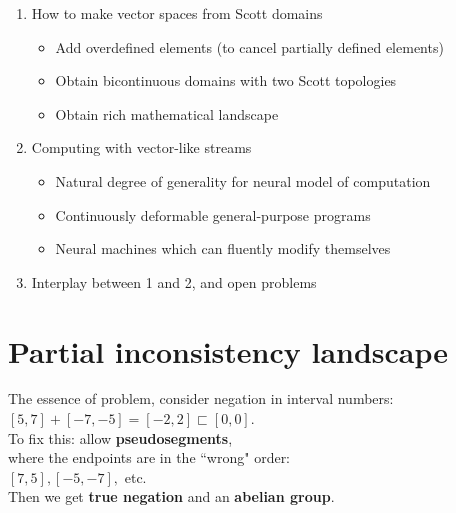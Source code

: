\documentclass{beamer}
\newcommand{\msgray}[1]{{\color{mygray} #1}}
\begin{document}
\begin{frame}

\begin{enumerate}

  \item How to make vector spaces from Scott domains

  \begin{itemize}
      \item Add overdefined elements (to cancel partially defined elements)
      \item Obtain bicontinuous domains with two Scott topologies
      \item Obtain rich mathematical landscape
  \end{itemize}

  \vspace{2ex}

  \item Computing with vector-like streams

  \begin{itemize}
      \item Natural degree of generality for neural model of computation
      \item Continuously deformable general-purpose programs
      \item Neural machines which can fluently modify themselves

  \end{itemize}

  \vspace{2ex}

  \item Interplay between 1 and 2, and open problems

\end{enumerate}

\end{frame}

\section{Partial inconsistency landscape}

\begin{frame}
    The essence of problem, consider negation in interval numbers:\\[2ex]

    $[5, 7] + [-7, -5] = [-2, 2] \sqsubset [0, 0]$.\\[2ex]

    \msgray{To fix this: allow {\bf pseudosegments},\\ where the endpoints are in the ``wrong" order:\\[2ex]

    $[7, 5], [-5, -7],$ etc.\\[2ex]

    Then we get {\bf true negation} and an {\bf abelian group}.}

\end{frame}
\end{document}
